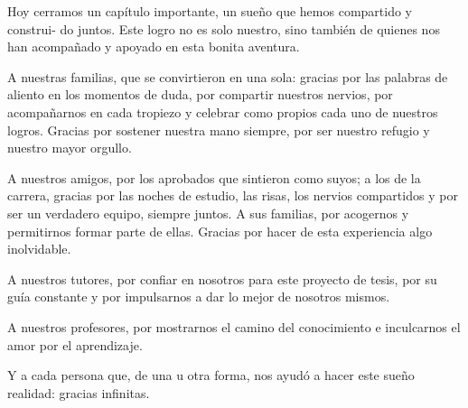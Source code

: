 \begin{acknowledgements}
    Hoy cerramos un capítulo importante, un sueño que hemos compartido y construi-
    do juntos. Este logro no es solo nuestro, sino también de quienes nos han acompañado
    y apoyado en esta bonita aventura.

    A nuestras familias, que se convirtieron en una sola: gracias por las palabras de
    aliento en los momentos de duda, por compartir nuestros nervios, por acompañarnos
    en cada tropiezo y celebrar como propios cada uno de nuestros logros. Gracias por
    sostener nuestra mano siempre, por ser nuestro refugio y nuestro mayor orgullo.

    A nuestros amigos, por los aprobados que sintieron como suyos; a los de la carrera,
    gracias por las noches de estudio, las risas, los nervios compartidos y por ser un
    verdadero equipo, siempre juntos. A sus familias, por acogernos y permitirnos formar
    parte de ellas. Gracias por hacer de esta experiencia algo inolvidable.

    A nuestros tutores, por confiar en nosotros para este proyecto de tesis, por su guía
    constante y por impulsarnos a dar lo mejor de nosotros mismos.

    A nuestros profesores, por mostrarnos el camino del conocimiento e inculcarnos el
    amor por el aprendizaje.
    
    Y a cada persona que, de una u otra forma, nos ayudó a hacer este sueño realidad:
    gracias infinitas.

\end{acknowledgements}
